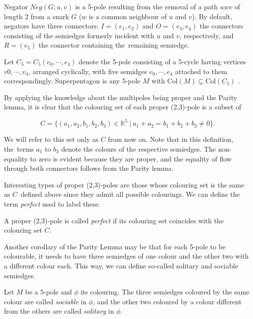 Negator $Neg(G;u,v)$ is a 5-pole resulting from the removal of a path $uwv$ of length 2 from a snark $G$ ($w$ is a common neighbour of $u$ and $v$). By default, negators have three connectors: $I = (e_1,e_2)$ and $O = (e_3,e_4)$ the connectors consisting of the semiedges formerly incident with $u$ and $v$, respectively, and $R = (e_5)$ the connector containing the~remaining semiedge.

Let $C_5 = C_5(e_0, \cdots , e_4)$ denote the 5-pole consisting of a 5-cycle having vertices $v0, \cdots , v_4$, arranged cyclically, with five semidges $e_0,\cdots,e_4$ attached to them correspondingly. Superpentagon is any 5-pole $M$ with $\text{Col}(M)\subseteq \text{Col}(C_5)$ \cite{MorphologyOfSmall}.

By applying the knowledge about the multipoles being proper and the Parity lemma, it is clear that the colouring set of each proper (2,3)-pole is a subset of

$$C=\{(a_1,a_2,b_1,b_2,b_3)\in\mathbb{K}^5~|~a_1+a_2=b_1+b_2+b_3\neq 0\}.$$

We will refer to this set only as $C$ from now on. Note that in this definition, the~terms $a_1$ to $b_3$ denote the colours of the respective semiedges. The non-equality to zero is evident because they are proper, and the equality of flow through both connectors follows from the Parity lemma.

Interesting types of proper (2,3)-poles are those whose colouring set is the same as $C$~defined above since they admit all possible colourings. We can define the term \textit{perfect} used to label these.

\begin{definition}
	A proper (2,3)-pole is called \textit{perfect} if its colouring set coincides with the colouring set $C$.
\end{definition}

Another corollary of the Parity Lemma may be that for each 5-pole to be colourable, it needs to have three semiedges of one colour and the other two with a different colour each. This way, we can define so-called solitary and sociable semiedges.

\begin{definition}
	Let $M$ be a 5-pole and $\phi$ its colouring. The three semiedges coloured by the same colour are called \textit{sociable} in $\phi$, and the other two coloured by a colour different from the others are called \textit{solitary} in $\phi$.
\end{definition}

